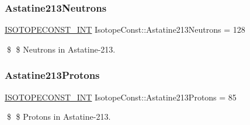 \subsubsection{\texorpdfstring{Astatine213\+Neutrons}{Astatine213Neutrons}}
{\footnotesize\ttfamily \mbox{\hyperlink{group___isotope_const-_macros_ga5f18360b3e99483a35c32d789e62621c}{I\+S\+O\+T\+O\+P\+E\+C\+O\+N\+S\+T\+\_\+\+I\+NT}} Isotope\+Const\+::\+Astatine213\+Neutrons = 128}

\$ \$ Neutrons in Astatine-\/213. \mbox{\label{group___isotope_const-_astatine-_at213_ga9d15e5ecee3df899d88b6c785d43fa1e}} 
\subsubsection{\texorpdfstring{Astatine213\+Protons}{Astatine213Protons}}
{\footnotesize\ttfamily \mbox{\hyperlink{group___isotope_const-_macros_ga5f18360b3e99483a35c32d789e62621c}{I\+S\+O\+T\+O\+P\+E\+C\+O\+N\+S\+T\+\_\+\+I\+NT}} Isotope\+Const\+::\+Astatine213\+Protons = 85}

\$ \$ Protons in Astatine-\/213. 